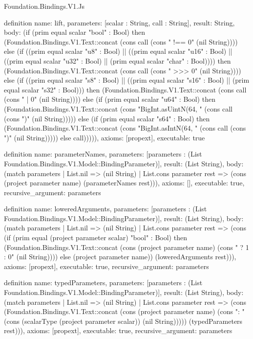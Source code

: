 \begin{lexlean}{Foundation.Bindings.V1.Js}
\begin{semanticmodule}
definition{
  name: lift,
  parameters: [scalar : String, call : String],
  result: String,
  body: (if (prim equal scalar "bool" : Bool) then (Foundation.Bindings.V1.Text::concat (cons call (cons " !== 0" (nil String)))) else (if ((prim equal scalar "u8" : Bool) || ((prim equal scalar "u16" : Bool) || ((prim equal scalar "u32" : Bool) || (prim equal scalar "char" : Bool)))) then (Foundation.Bindings.V1.Text::concat (cons call (cons " >>> 0" (nil String)))) else (if ((prim equal scalar "s8" : Bool) || ((prim equal scalar "s16" : Bool) || (prim equal scalar "s32" : Bool))) then (Foundation.Bindings.V1.Text::concat (cons call (cons " | 0" (nil String)))) else (if (prim equal scalar "u64" : Bool) then (Foundation.Bindings.V1.Text::concat (cons "BigInt.asUintN(64, " (cons call (cons ")" (nil String))))) else (if (prim equal scalar "s64" : Bool) then (Foundation.Bindings.V1.Text::concat (cons "BigInt.asIntN(64, " (cons call (cons ")" (nil String))))) else call))))),
  axioms: [propext],
  executable: true
}

definition{
  name: parameterNames,
  parameters: [parameters : (List Foundation.Bindings.V1.Model::BindingParameter)],
  result: (List String),
  body: (match parameters
    | List.nil => (nil String)
    | List.cons parameter rest => (cons (project parameter name) (parameterNames rest))),
  axioms: [],
  executable: true,
  recursive_argument: parameters
}

definition{
  name: loweredArguments,
  parameters: [parameters : (List Foundation.Bindings.V1.Model::BindingParameter)],
  result: (List String),
  body: (match parameters
    | List.nil => (nil String)
    | List.cons parameter rest => (cons (if (prim equal (project parameter scalar) "bool" : Bool) then (Foundation.Bindings.V1.Text::concat (cons (project parameter name) (cons " ? 1 : 0" (nil String)))) else (project parameter name)) (loweredArguments rest))),
  axioms: [propext],
  executable: true,
  recursive_argument: parameters
}

definition{
  name: typedParameters,
  parameters: [parameters : (List Foundation.Bindings.V1.Model::BindingParameter)],
  result: (List String),
  body: (match parameters
    | List.nil => (nil String)
    | List.cons parameter rest => (cons (Foundation.Bindings.V1.Text::concat (cons (project parameter name) (cons ": " (cons (scalarType (project parameter scalar)) (nil String))))) (typedParameters rest))),
  axioms: [propext],
  executable: true,
  recursive_argument: parameters
}


\end{semanticmodule}
\end{lexlean}
